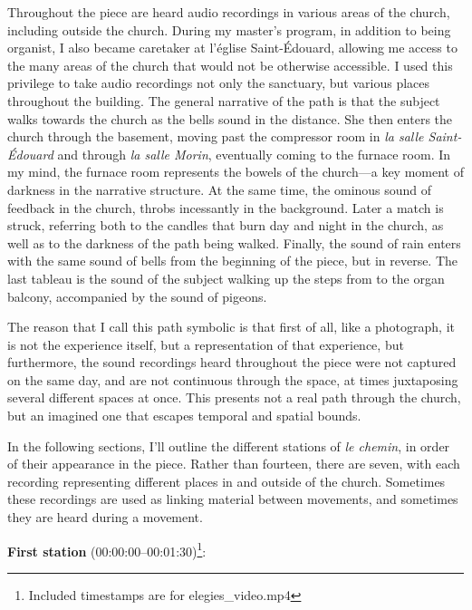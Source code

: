 \documentclass[12pt,twoside,maitrise]{dms_ks}
\theoremstyle{definition}
\begin{document}
{Throughout the piece are heard audio recordings in various areas of the church, including outside the church. 
During my master's program, in addition to being organist, I also became caretaker at l'église Saint-Édouard, allowing me access to the many areas of the church that would not be otherwise accessible. 
I used this privilege to take audio recordings not only the sanctuary, but various places throughout the building. 
The general narrative of the path is that the subject walks towards the church as the bells sound in the distance. 
She then enters the church through the basement, moving past the compressor room in \textit{la salle Saint-Édouard} and through \textit{la salle Morin}, eventually coming to the furnace room. 
In my mind, the furnace room represents the bowels of the church---a key moment of darkness in the narrative structure. 
At the same time, the ominous sound of feedback in the church, throbs incessantly in the background. 
Later a match is struck, referring both to the candles that burn day and night in the church, as well as to the darkness of the path being walked. 
Finally, the sound of rain enters with the same sound of bells from the beginning of the piece, but in reverse. 
The last tableau is the sound of the subject walking up the steps from to the organ balcony, accompanied by the sound of pigeons.

The reason that I call this path symbolic is that first of all, like a photograph, it is not the experience itself, but a representation of that experience, but furthermore, the sound recordings heard throughout the piece were not captured on the same day, and are not continuous through the space, at times juxtaposing several different spaces at once. 
This presents not a real path through the church, but an imagined one that escapes temporal and spatial bounds.

In the following sections, I'll outline the different stations of \textit{le chemin}, in order of their appearance in the piece. 
Rather than fourteen, there are seven, with each recording representing different places in and outside of the church. 
Sometimes these recordings are used as linking material between movements, and sometimes they are heard during a movement.

\textbf{First station} (00:00:00--00:01:30)\footnote{Included timestamps are for elegies\_video.mp4}:

}
\end{document}
